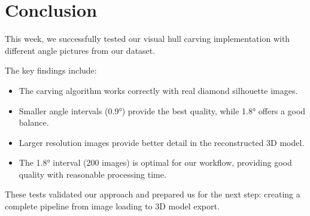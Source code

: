 \documentclass[a4paper,12pt]{article}
\begin{document}
\section{Conclusion}

This week, we successfully tested our visual hull carving implementation with different angle pictures from our dataset.  

The key findings include:

\begin{itemize}
    \item The carving algorithm works correctly with real diamond silhouette images.
    \item Smaller angle intervals (0.9°) provide the best quality, while 1.8° offers a good balance.
    \item Larger resolution images provide better detail in the reconstructed 3D model.
    \item The 1.8° interval (200 images) is optimal for our workflow, providing good quality with reasonable processing time.
\end{itemize}

These tests validated our approach and prepared us for the next step: creating a complete pipeline from image loading to 3D model export.
\end{document}
